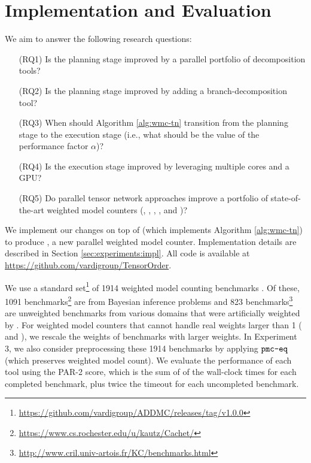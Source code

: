 \section{Implementation and Evaluation}
\label{sec:experiments}

We aim to answer the following research questions:

\begin{enumerate}\itemsep0em 
    \item[(RQ1)] Is the planning stage improved by a parallel portfolio of decomposition tools?
    
    \item[(RQ2)] Is the planning stage improved by adding a branch-decomposition tool?
    
    \item[(RQ3)] When should Algorithm \ref{alg:wmc-tn} transition from the planning stage to the execution stage (i.e., what should be the value of the performance factor $\alpha$)?
    
    \item[(RQ4)] Is the execution stage improved by leveraging multiple cores and a GPU?
    
    \item[(RQ5)] Do parallel tensor network approaches improve a portfolio of state-of-the-art weighted model counters (, , , , and )?
\end{enumerate}

We implement our changes on top of  \cite{DDV19} (which implements Algorithm \ref{alg:wmc-tn}) to produce , a new parallel weighted model counter. Implementation details are described in Section \ref{sec:experiments:impl}. All code is available at  \url{https://github.com/vardigroup/TensorOrder}.

We use a standard set\footnote{\url{https://github.com/vardigroup/ADDMC/releases/tag/v1.0.0}} of 1914 weighted model counting benchmarks \cite{DPV20}. Of these, 1091 benchmarks\footnote{\url{https://www.cs.rochester.edu/u/kautz/Cachet/}} are from Bayesian inference problems \cite{SBK05} and 823 benchmarks\footnote{\url{http://www.cril.univ-artois.fr/KC/benchmarks.html}} are unweighted benchmarks from various domains that were artificially weighted by \cite{DPV20}. For weighted model counters that cannot handle real weights larger than 1 ( and ), we rescale the weights of benchmarks with larger weights. In Experiment 3, we also consider preprocessing these 1914 benchmarks by applying $\texttt{\upshape pmc-eq}$ \cite{LM14} (which preserves weighted model count). %
We evaluate the performance of each tool using the PAR-2 score, which is the sum of of the wall-clock times for each completed benchmark, plus twice the timeout for each uncompleted benchmark.

